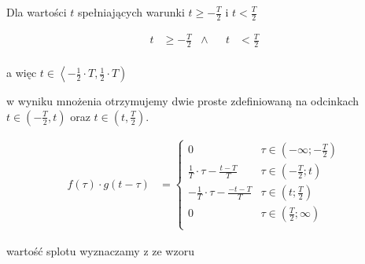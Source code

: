 \begin{task}
Dla wartości $t$ spełniających warunki $t \geq -\frac{T}{2}$ i $t<\frac{T}{2}$

\begin{align*}
t& \geq -\frac{T}{2} &\wedge&&  t&<\frac{T}{2}\\
\end{align*}

a więc $t\in \left<-\frac{1}{2}\cdot T, \frac{1}{2}\cdot T \right)$

w wyniku mnożenia otrzymujemy dwie proste zdefiniowaną na odcinkach $t \in \left(-\frac{T}{2}, t\right)$ oraz $t \in \left(t, \frac{T}{2}\right)$.

\begin{align*}
f(\tau) \cdot g(t-\tau)&=\begin{cases}
0 & \tau \in \left(-\infty; -\frac{T}{2}\right)\\
\frac{1}{T}\cdot \tau - \frac{t-T}{T} & \tau \in \left(-\frac{T}{2}; t\right)\\
-\frac{1}{T}\cdot \tau - \frac{-t-T}{T} & \tau \in \left(t; \frac{T}{2}\right)\\
0 & \tau \in \left( \frac{T}{2}; \infty \right)\\
\end{cases}
\end{align*}

wartość splotu wyznaczamy z ze wzoru


\end{task}
